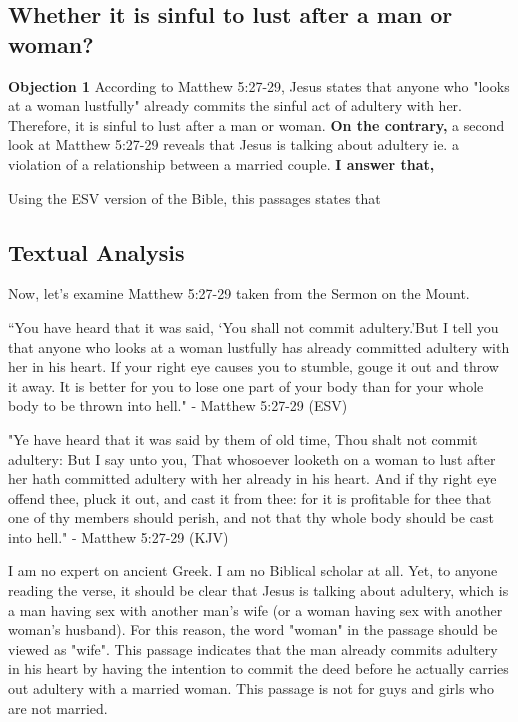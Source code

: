 \documentclass[a4paper, parskip=full, 15pt]{article}
\begin{document}
\subsection{Whether it is sinful to lust after a man or woman?}
\textbf{Objection 1} According to Matthew 5:27-29, Jesus states that anyone who "looks at a woman lustfully" already commits the sinful act of adultery with her. Therefore, it is sinful to lust after a man or woman.
\textbf{On the contrary,} a second look at Matthew 5:27-29 reveals that Jesus is talking about adultery ie. a violation of a relationship between a married couple.
\textbf{I answer that,}

Using the ESV version of the Bible, this passages states that

\subsection{Textual Analysis}

Now, let's examine Matthew 5:27-29 taken from the Sermon on the Mount.



“You have heard that it was said, ‘You shall not commit adultery.’But I tell you that anyone who looks at a woman lustfully has already committed adultery with her in his heart. If your right eye causes you to stumble, gouge it out and throw it away. It is better for you to lose one part of your body than for your whole body to be thrown into hell." - Matthew 5:27-29 (ESV)

"Ye have heard that it was said by them of old time, Thou shalt not commit adultery: But I say unto you, That whosoever looketh on a woman to lust after her hath committed adultery with her already in his heart. And if thy right eye offend thee, pluck it out, and cast it from thee: for it is profitable for thee that one of thy members should perish, and not that thy whole body should be cast into hell." - Matthew 5:27-29 (KJV)

I am no expert on ancient Greek. I am no Biblical scholar at all. Yet, to anyone reading the verse, it should be clear that Jesus is talking about adultery, which is a man having sex with another man's wife (or a woman having sex with another woman's husband). For this reason, the word "woman" in the passage should be viewed as "wife". This passage indicates that the man already commits adultery in his heart by having the intention to commit the deed before he actually carries out adultery with a married woman. This passage is not for guys and girls who are not married.
\end{document}
